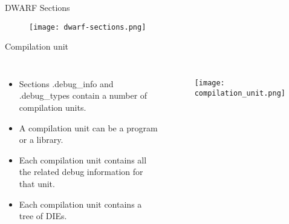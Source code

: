 
\begin{frame}{DWARF Sections}
	\begin{figure}
		\texttt{[image: dwarf-sections.png]}
	\end{figure}
\end{frame}


\begin{frame}{Compilation unit}


    \begin{columns}[c] %

        \begin{itemize}
		\item Sections .debug\_info and .debug\_types contain a number of compilation units.
		\item A compilation unit can be a program or a library.
		\item Each compilation unit contains all the related debug information for that unit.
		\item Each compilation unit contains a tree of DIEs.
        \end{itemize}

	\begin{figure}
		\texttt{[image: compilation\_unit.png]}
	\end{figure}

    \end{columns}
\end{frame}




